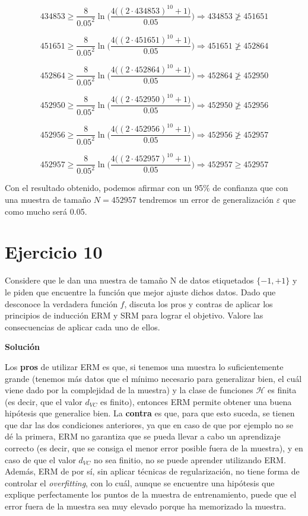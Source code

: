 \documentclass[11pt,a4paper]{article}
\newcommand{\answer}{\noindent\textbf{Solución}}
\newcommand{\addtoc}[1]{\addcontentsline{toc}{section}{#1}}
\begin{document}
\[ 434853 \geq \frac{8}{0.05^2} \ln \Bigg( \frac{4 \big( (2 \cdot 434853)^{10} + 1 \big)}{0.05} \Bigg)
\Rightarrow 434853 \ngeq 451651 \]

\[ 451651 \geq \frac{8}{0.05^2} \ln \Bigg( \frac{4 \big( (2 \cdot 451651)^{10} + 1 \big)}{0.05} \Bigg)
\Rightarrow 451651 \ngeq 452864 \]

\[ 452864 \geq \frac{8}{0.05^2} \ln \Bigg( \frac{4 \big( (2 \cdot 452864)^{10} + 1 \big)}{0.05} \Bigg)
\Rightarrow 452864 \ngeq 452950 \]

\[ 452950 \geq \frac{8}{0.05^2} \ln \Bigg( \frac{4 \big( (2 \cdot 452950)^{10} + 1 \big)}{0.05} \Bigg)
\Rightarrow 452950 \ngeq 452956 \]

\[ 452956 \geq \frac{8}{0.05^2} \ln \Bigg( \frac{4 \big( (2 \cdot 452956)^{10} + 1 \big)}{0.05} \Bigg)
\Rightarrow 452956 \ngeq 452957 \]

\[ 452957 \geq \frac{8}{0.05^2} \ln \Bigg( \frac{4 \big( (2 \cdot 452957)^{10} + 1 \big)}{0.05} \Bigg)
\Rightarrow 452957 \geq 452957 \]

Con el resultado obtenido, podemos afirmar con un 95\% de confianza que con una muestra de tamaño $N = 452957$ tendremos
un error de generalización $\varepsilon$ que como mucho será 0.05.

\section*{Ejercicio 10}
\addtoc{Ejercicio 10}

\noindent Considere que le dan una nuestra de tamaño N de datos etiquetados $\lbrace -1, +1 \rbrace$ y le piden que
encuentre la función que mejor ajuste dichos datos. Dado que desconoce la verdadera función $f$, discuta los pros y 
contras de aplicar los principios de inducción ERM y SRM para lograr el objetivo. Valore las consecuencias de aplicar
cada uno de ellos.

\answer

Los \textbf{pros} de utilizar ERM es que, si tenemos una muestra lo suficientemente grande (tenemos más datos que el mínimo
necesario para generalizar bien, el cuál viene dado por la complejidad de la muestra) y la clase de funciones $\mathcal{H}$ es
finita (es decir, que el valor $d_{VC}$ es finito), entonces ERM permite obtener una buena hipótesis que generalice bien.
La \textbf{contra} es que, para que esto suceda, se tienen que dar las dos condiciones anteriores, ya que en caso de que por
ejemplo no se dé la primera, ERM no garantiza que se pueda llevar a cabo un aprendizaje correcto (es decir, que se consiga
el menor error posible fuera de la muestra), y en caso de que el valor $d_{VC}$ no sea finitio, no se puede aprender utilizando
ERM. Además, ERM de por sí, sin aplicar técnicas de regularización, no tiene forma de controlar el \textit{overfitting}, con lo
cuál, aunque se encuentre una hipótesis que explique perfectamente los puntos de la muestra de entrenamiento, puede que el
error fuera de la muestra sea muy elevado porque ha memorizado la muestra.
\end{document}

